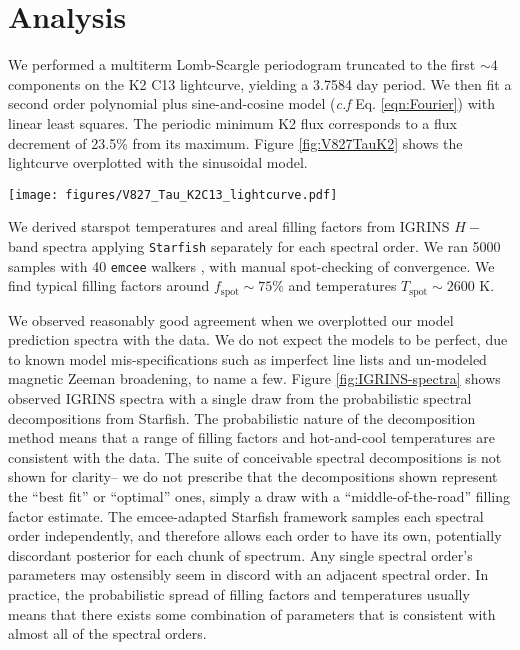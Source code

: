 \documentclass[twocolumn]{emulateapj}%
\begin{document}
\section{Analysis}\label{sec:Analysis}
 We performed a multiterm Lomb-Scargle periodogram \citep{ivezic14} truncated to the first $\sim 4$ components \citep{vanderplas15a} on the K2 C13 lightcurve, yielding a 3.7584 day period.  We then fit a second order polynomial plus sine-and-cosine model (\emph{c.f} Eq. \ref{eqn:Fourier}) with linear least squares.  The periodic minimum K2 flux corresponds to a flux decrement of 23.5\% from its maximum.  Figure \ref{fig:V827TauK2} shows the lightcurve overplotted with the sinusoidal model.

 \begin{figure*}
 \centering
 \texttt{[image: figures/V827\_Tau\_K2C13\_lightcurve.pdf]}
 \caption{K2 C13 lightcurve of V827 Tau with a polynomial and sinusoidal model overplotted.  A few flares are perceptible.}
 \label{fig:V827TauK2}
\end{figure*}

We derived starspot temperatures and areal filling factors from IGRINS $H-$band spectra applying \texttt{Starfish} separately for each spectral order.  We ran 5000 samples with 40 \texttt{emcee} walkers \citep{foreman13}, with manual spot-checking of convergence.  We find typical filling factors around $f_\mathrm{spot} \sim 75\%$ and temperatures $T_\mathrm{spot} \sim 2600$ K.

We observed reasonably good agreement when we overplotted our model prediction spectra with the data.  We do not expect the models to be perfect, due to known model mis-specifications such as imperfect line lists and un-modeled magnetic Zeeman broadening, to name a few.  Figure \ref{fig:IGRINS-spectra} shows observed IGRINS spectra with a single draw from the probabilistic spectral decompositions from Starfish.  The probabilistic nature of the decomposition method means that a range of filling factors and hot-and-cool temperatures are consistent with the data.  The suite of conceivable spectral decompositions is not shown for clarity-- we do not prescribe that the decompositions shown represent the ``best fit'' or ``optimal'' ones, simply a draw with a ``middle-of-the-road'' filling factor estimate.  The emcee-adapted Starfish framework samples each spectral order independently, and therefore allows each order to have its own, potentially discordant posterior for each chunk of spectrum.  Any single spectral order's parameters may ostensibly seem in discord with an adjacent spectral order.  In practice, the probabilistic spread of filling factors and temperatures usually means that there exists some combination of parameters that is consistent with almost all of the spectral orders.
\end{document}
